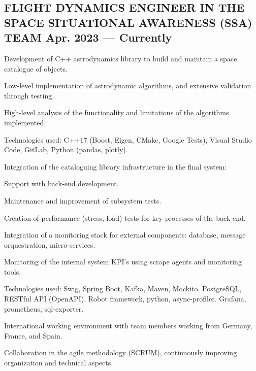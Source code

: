 \documentclass[letter,10pt]{article}
\begin{document}
\subsection{{FLIGHT DYNAMICS ENGINEER IN THE SPACE SITUATIONAL AWARENESS (SSA) TEAM \hfill Apr. 2023  --- Currently}}
\begin{zitemize}
\item Development of C++ astrodynamics library to build and maintain a space catalogue of objects.
\begin{zitemize}
    \item Low-level implementation of astrodynamic algorithms, and extensive validation through testing.
    \item High-level analysis of the functionality and limitations of the algorithms implemented.
    \item Technologies used: C++17 (Boost, Eigen, CMake, Google Tests), Visual Studio Code, GitLab, Python (pandas, plotly). 
\end{zitemize}
\item Integration of the cataloguing library infrastructure in the final system:
\begin{zitemize}
    \item Support with back-end development. 
    \item Maintenance and improvement of subsystem tests.
    \item Creation of performance (stress, load) tests for key processes of the back-end. 
    \item Integration of a monitoring stack for external components: database, message orquestration, micro-services.
    \item Monitoring of the internal system KPI's using scrape agents and monitoring tools.
    \item Technologies used: Swig, Spring Boot, Kafka, Maven, Mockito. PostgreSQL, RESTful API (OpenAPI). Robot framework, python, async-profiler. Grafana, prometheus, sql-exporter.
\end{zitemize}
\item International working environment with team members working from Germany, France, and Spain.
\item Collaboration in the agile methodology (SCRUM), continuously improving organization and technical aspects.
\end{zitemize}
\end{document}
